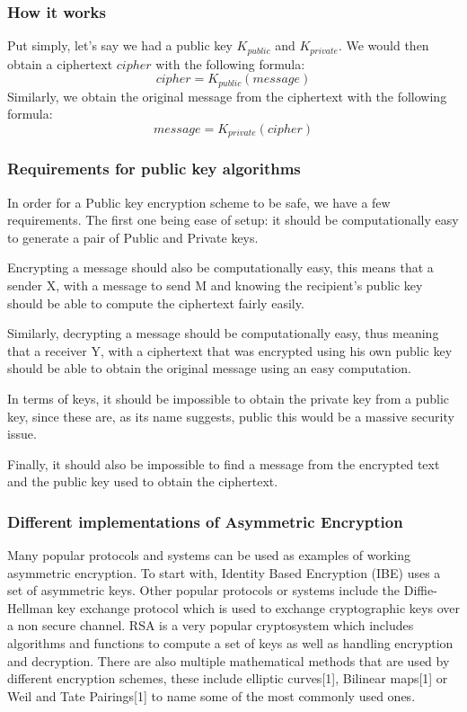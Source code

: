 \documentclass[conference]{IEEEtran}
\begin{document}
\subsubsection{How it works}
Put simply, let's say we had a public key $K_{public}$ and $K_{private}$.
We would then obtain a ciphertext $cipher$ with the following formula: 
\begin{equation*}
    cipher = K_{public}(message)
\end{equation*}
Similarly, we obtain the original message from the ciphertext with the following formula:
\begin{equation*}
    message = K_{private}(cipher)
\end{equation*}


\subsubsection{Requirements for public key algorithms}
In order for a Public key encryption scheme to be safe, we have a few requirements.
The first one being ease of setup: it should be computationally easy to generate
a pair of Public and Private keys.

Encrypting a message should also be computationally easy, this means that a 
sender X, with a message to send M and knowing the recipient's public key 
should be able to compute the ciphertext fairly easily.

Similarly, decrypting a message should be computationally easy, thus meaning that
a receiver Y, with a ciphertext that was encrypted using his own public key 
should be able to obtain the original message using an easy computation.

In terms of keys, it should be impossible to obtain the private key from a 
public key, since these are, as its name suggests, public this would be a 
massive security issue.

Finally, it should also be impossible to find a message from the encrypted text and 
the public key used to obtain the ciphertext.


\subsubsection{Different implementations of Asymmetric Encryption}
Many popular protocols and systems can be used as examples of working 
asymmetric encryption. To start with, Identity Based Encryption (IBE)
uses a set of asymmetric keys. Other popular protocols or systems include
the Diffie-Hellman key exchange protocol which is used to exchange cryptographic 
keys over a non secure channel. RSA is a very popular cryptosystem which includes
algorithms and functions to compute a set of keys as well as handling encryption and decryption.
There are also multiple mathematical methods that are used by different encryption schemes,
these include  elliptic curves[1], Bilinear maps[1] or Weil and Tate Pairings[1] to name
some of the most commonly used ones.
\end{document}
